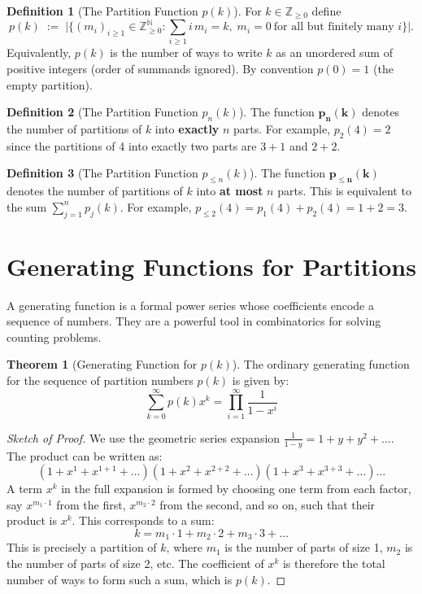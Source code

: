 \documentclass{article}
\theoremstyle{definition}
\newtheorem{definition}{Definition}
\newtheorem{theorem}{Theorem}
\begin{document}
\begin{definition}[The Partition Function $p(k)$]
  For $k\in\mathbb{Z}_{\ge0}$ define
  \[
    p(k)\;:=\;\Bigg|\Big\{(m_i)_{i\ge1}\in\mathbb{Z}_{\ge0}^{\mathbb{N}} :
    \sum_{i\ge1} i\,m_i = k,\; m_i=0\ \text{for all but finitely many }i\Big\}\Bigg|.
  \]
  Equivalently, $p(k)$ is the number of ways to write $k$ as an unordered sum of positive integers (order of summands ignored). By convention $p(0)=1$ (the empty partition).
\end{definition}

\begin{definition}[The Partition Function $p_n(k)$]
  The function $\boldsymbol{p_n(k)}$ denotes the number of partitions of $k$ into \textbf{exactly} $n$ parts. For example, $p_2(4)=2$ since the partitions of 4 into exactly two parts are $3+1$ and $2+2$.
\end{definition}

\begin{definition}[The Partition Function $p_{\le n}(k)$]
  The function $\boldsymbol{p_{\le n}(k)}$ denotes the number of partitions of $k$ into \textbf{at most} $n$ parts. This is equivalent to the sum $\sum_{j=1}^{n} p_j(k)$. For example, $p_{\le 2}(4) = p_1(4) + p_2(4) = 1 + 2 = 3$.
\end{definition}

\section{Generating Functions for Partitions}
A generating function is a formal power series whose coefficients encode a sequence of numbers. They are a powerful tool in combinatorics for solving counting problems.

\begin{theorem}[Generating Function for $p(k)$]
  The ordinary generating function for the sequence of partition numbers $p(k)$ is given by:
  $$ \sum_{k=0}^{\infty} p(k)x^k = \prod_{i=1}^{\infty} \frac{1}{1-x^i} $$
\end{theorem}
\begin{proof}[Sketch of Proof]
  We use the geometric series expansion $\frac{1}{1-y} = 1 + y + y^2 + \dots$.
  The product can be written as:
  $$ (1+x^1+x^{1+1}+\dots)(1+x^2+x^{2+2}+\dots)(1+x^3+x^{3+3}+\dots)\dots $$
  A term $x^k$ in the full expansion is formed by choosing one term from each factor, say $x^{m_1 \cdot 1}$ from the first, $x^{m_2 \cdot 2}$ from the second, and so on, such that their product is $x^k$. This corresponds to a sum:
  $$ k = m_1 \cdot 1 + m_2 \cdot 2 + m_3 \cdot 3 + \dots $$
  This is precisely a partition of $k$, where $m_1$ is the number of parts of size 1, $m_2$ is the number of parts of size 2, etc. The coefficient of $x^k$ is therefore the total number of ways to form such a sum, which is $p(k)$.
\end{proof}
\end{document}

